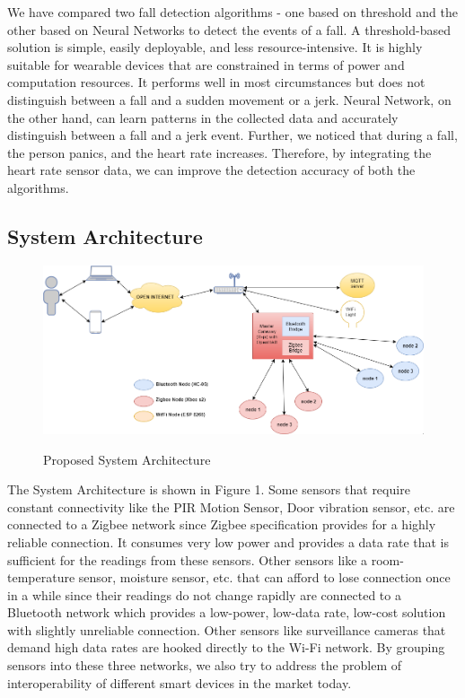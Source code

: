 We have compared two fall detection algorithms - one based on threshold and the other based on Neural Networks to detect the events of a fall. A threshold-based solution is simple, easily deployable, and less resource-intensive. It is highly suitable for wearable devices that are constrained in terms of power and computation resources. It performs well in most circumstances but does not distinguish between a fall and a sudden movement or a jerk. Neural Network, on the other hand, can learn patterns in the collected data and accurately distinguish between a fall and a jerk event. Further, we noticed that during a fall, the person panics, and the heart rate increases. Therefore, by integrating the heart rate sensor data, we can improve the detection accuracy of both the algorithms.

\subsection{System Architecture}

\begin{figure}
\includegraphics[scale=0.4]{images/architecture_new.png}
\label{fig:1}
\caption{Proposed System Architecture}
\end{figure}
The System Architecture is shown in Figure 1. Some sensors that require constant connectivity like the PIR Motion Sensor, Door vibration sensor, etc. are connected to a Zigbee network since Zigbee specification provides for a highly reliable connection. It consumes very low power and provides a data rate that is sufficient for the readings from these sensors. Other sensors like a room-temperature sensor, moisture sensor, etc. that can afford to lose connection once in a while since their readings do not change rapidly are connected to a Bluetooth network which provides a low-power, low-data rate, low-cost solution with slightly unreliable connection. Other sensors like surveillance cameras that demand high data rates are hooked directly to the Wi-Fi network. By grouping sensors into these three networks, we also try to address the problem of interoperability of different smart devices in the market today. 

